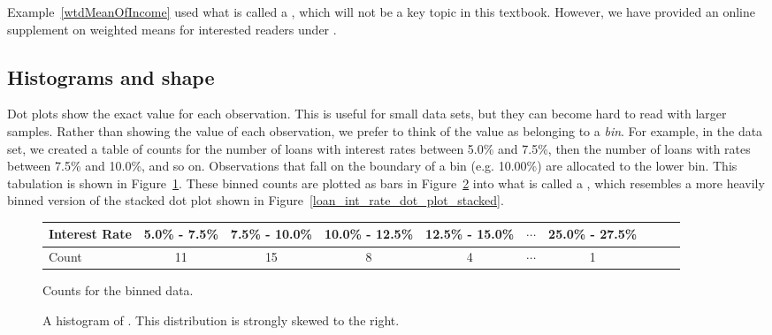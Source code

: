 Example~\ref{wtdMeanOfIncome} used what is called
a ,
which will not be a key topic in this textbook.
However, we have provided an online supplement on
weighted means for interested readers under
.

\subsection{Histograms and shape}
\label{histogramsAndShape}

Dot plots show the exact value for each observation.
This is useful for small data sets, but they can become
hard to read with larger samples. Rather than showing the
value of each observation, we prefer to think of the value
as belonging to a \emph{bin}.
For example, in the  data set, we created
a table of counts for the number of loans with interest
rates between 5.0\% and 7.5\%, then the number of loans
with rates between 7.5\% and 10.0\%, and so on.
Observations that fall on the boundary of a bin
(e.g. 10.00\%) are allocated to the lower bin.
This tabulation is shown in Figure~\ref{binnedIntRateAmountTable}.
These binned counts are plotted as bars in
Figure~\ref{loan50IntRateHist} into what is called
a , which resembles a more heavily binned
version of the stacked dot plot shown in
Figure~\ref{loan_int_rate_dot_plot_stacked}.

\begin{figure}[ht]
\centering\small
\begin{tabular}{l ccc ccc ccc}
  \hline
  Interest Rate &
      5.0\% - 7.5\% &
      7.5\% - 10.0\% &
      10.0\% - 12.5\% &
      12.5\% - 15.0\% &
      $\cdots$ &
      25.0\% - 27.5\% \\
  \hline
  Count & 11 & 15 & 8 & 4 & $\cdots$ & 1 \\
  \hline
\end{tabular}
\caption{Counts for the binned
     data.}
\label{binnedIntRateAmountTable}
\end{figure}

\begin{figure}[bth]
  \centering
  \caption{A histogram of .
      This distribution is strongly skewed to the right.
      }
  \label{loan50IntRateHist}
\end{figure}


